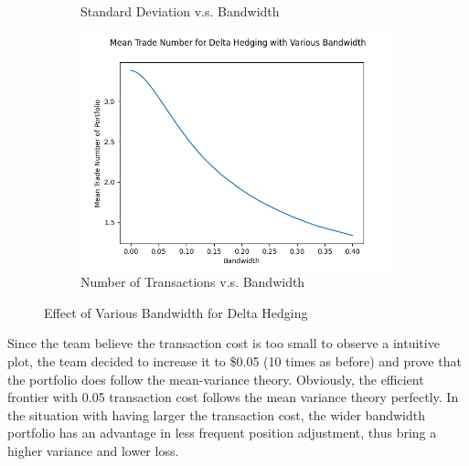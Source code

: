 \documentclass[12pt]{article}
\begin{document}
\begin{figure}[H]
\begin{subfigure}{.5\textwidth}
    \caption{Standard Deviation v.s. Bandwidth}
  \end{subfigure}%
  \hfill
  \begin{subfigure}{.5\textwidth}
    \centering
    \includegraphics[width=\linewidth]{trade.png}
    \caption{Number of Transactions v.s. Bandwidth}
  \end{subfigure}%
  \caption{Effect of Various Bandwidth for Delta Hedging}
\end{figure}

\noindent
Since the team believe the transaction cost is too small to observe a intuitive plot, the team decided to increase it to \$0.05 (10 times as before) and prove that the portfolio does follow the mean-variance theory. Obviously, the efficient frontier with 0.05 transaction cost follows the mean 
variance theory perfectly. In the situation with having larger the transaction cost, the wider bandwidth portfolio has an advantage in less frequent position adjustment, thus bring a higher variance and lower loss.
\end{document}
